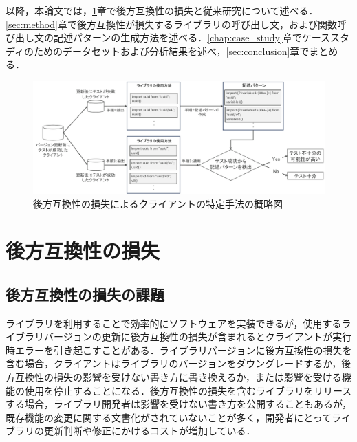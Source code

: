 \documentclass[T,J]{fose} %
\begin{document}
以降，本論文では，\ref{chap:intro}章で後方互換性の損失と従来研究について述べる．\ref{sec:method}章で後方互換性が損失するライブラリの呼び出し文，および関数呼び出し文の記述パターンの生成方法を述べる．\ref{chap:case_study}章でケーススタディのためのデータセットおよび分析結果を述べ，\ref{sec:conclusion}章でまとめる．



\begin{figure}[ht]
\centerline{\includegraphics[width=1.0\linewidth]{Iida_fig/Fose_method.pdf}}
\caption{後方互換性の損失によるクライアントの特定手法の概略図}
\label{fig:method-overview}
\end{figure}


\section{後方互換性の損失}\label{chap:intro}

\subsection{後方互換性の損失の課題}
ライブラリを利用することで効率的にソフトウェアを実装できるが，使用するライブラリバージョンの更新に後方互換性の損失が含まれるとクライアントが実行時エラーを引き起こすことがある．ライブラリバージョンに後方互換性の損失を含む場合，クライアントはライブラリのバージョンをダウングレードするか，後方互換性の損失の影響を受けない書き方に書き換えるか，または影響を受ける機能の使用を停止することになる．後方互換性の損失を含むライブラリをリリースする場合，ライブラリ開発者は影響を受けない書き方を公開することもあるが，既存機能の変更に関する文書化がされていないことが多く，開発者にとってライブラリの更新判断や修正にかけるコストが増加している\cite{mostafa2017experience}．
\end{document}
